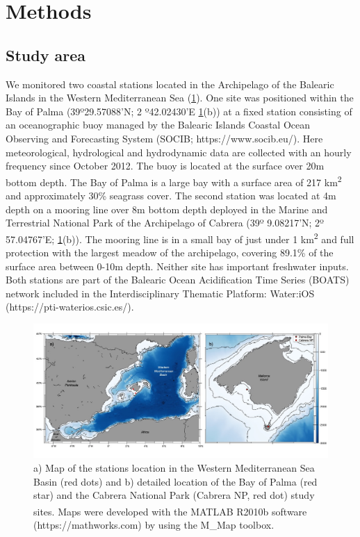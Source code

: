 \section{Methods}
\subsection*{Study area}
We monitored two coastal stations located in the Archipelago of the
Balearic Islands in the Western Mediterranean Sea (\cref{fig:1}). One site was
positioned within the Bay of Palma (39º29.57088’N; 2 º42.02430’E
\cref{fig:1}(b)) at a fixed station consisting of an oceanographic buoy managed
by the Balearic Islands Coastal Ocean Observing and Forecasting System (SOCIB;
https://www.socib.eu/). Here meteorological, hydrological and hydrodynamic data
are collected with an hourly frequency since October 2012. The buoy is located
at the surface over 20m bottom depth. The Bay of Palma is a large bay with a
surface area of 217 km\textsuperscript{2} and approximately 30\% seagrass
cover\cite{gazeau2005whole}. The second station was located at 4m depth on a
mooring line over 8m bottom depth deployed in the Marine and Terrestrial
National Park of the Archipelago of Cabrera (39º 9.08217’N; 2º 57.04767’E;
\cref{fig:1}(b)). The mooring line is in a small bay of just under 1
km\textsuperscript{2} and full protection with the largest meadow of the
archipelago, covering 89.1\% of the surface area between 0-10m
depth\cite{marba2002effectiveness}. Neither site has important freshwater
inputs. Both stations are part of the Balearic Ocean Acidification Time Series
(BOATS) network included in the Interdisciplinary Thematic Platform: Water:iOS
(https://pti-waterios.csic.es/).

\begin{figure}[H]
    \centering
    \includegraphics[width=\textwidth]{Figures/Fig_1.jpg}
    \caption{a) Map of the stations location in the Western Mediterranean Sea
        Basin (red dots) and b) detailed location of the Bay of Palma (red
        star) and
        the Cabrera National Park (Cabrera NP, red dot) study sites. Maps were
        developed with the MATLAB\textsuperscript{\textregistered} R2010b
        software
        (https://mathworks.com) by using the M\_Map
        toolbox\cite{pawlowicz2020m_map}.}
    \label{fig:1}
\end{figure}

